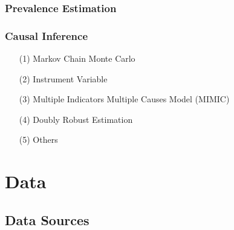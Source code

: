 \documentclass[12pt]{article}
\begin{document}
\subsubsection{Prevalence Estimation}
\subsubsection{Causal Inference}
\begin{itemize}
    \item[(1)] Markov Chain Monte Carlo
    \item[(2)] Instrument Variable
    \item[(3)] Multiple Indicators Multiple Causes Model (MIMIC)
    \item[(4)] Doubly Robust Estimation
    \item[(5)] Others
\end{itemize}









\vspace{50pt}

\section{Data}

\subsection{Data Sources}
\end{document}
